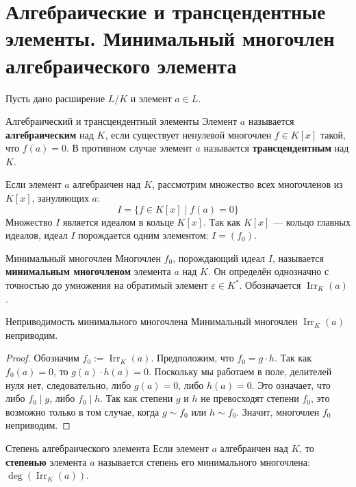 
\section{Алгебраические и трансцендентные элементы. Минимальный многочлен алгебраического элемента}

Пусть дано расширение $L/K$ и элемент $a \in L$.

\begin{Definition}{Алгебраический и трансцендентный элементы}{}
	Элемент $a$ называется \textbf{алгебраическим} над $K$, если существует ненулевой многочлен $f \in K[x]$ такой, что $f(a) = 0$.
	В противном случае элемент $a$ называется \textbf{трансцендентным} над $K$.
\end{Definition}

Если элемент $a$ алгебраичен над $K$, рассмотрим множество всех многочленов из $K[x]$, зануляющих $a$:
\[ I = \{ f \in K[x] \mid f(a) = 0 \} \]
Множество $I$ является идеалом в кольце $K[x]$. Так как $K[x]$ --- кольцо главных идеалов, идеал $I$ порождается одним элементом: $I = (f_0)$.

\begin{Definition}{Минимальный многочлен}{}
	Многочлен $f_0$, порождающий идеал $I$, называется \textbf{минимальным многочленом} элемента $a$ над $K$.
	Он определён однозначно с точностью до умножения на обратимый элемент $\varepsilon \in K^*$. Обозначается $\operatorname{Irr}_K(a)$.
\end{Definition}

\begin{Lemma}{Неприводимость минимального многочлена}{}
	Минимальный многочлен $\operatorname{Irr}_K(a)$ неприводим.
\end{Lemma}

\begin{proof}
	Обозначим $f_0 := \operatorname{Irr}_K(a)$. Предположим, что $f_0 = g \cdot h$.
	Так как $f_0(a) = 0$, то $g(a) \cdot h(a) = 0$. Поскольку мы работаем в поле, делителей нуля нет, следовательно, либо $g(a) = 0$, либо $h(a) = 0$.
	Это означает, что либо $f_0 \mid g$, либо $f_0 \mid h$.
	Так как степени $g$ и $h$ не превосходят степени $f_0$, это возможно только в том случае, когда $g \sim f_0$ или $h \sim f_0$.
	Значит, многочлен $f_0$ неприводим.
\end{proof}

\begin{Definition}{Степень алгебраического элемента}{}
	Если элемент $a$ алгебраичен над $K$, то \textbf{степенью} элемента $a$ называется степень его минимального многочлена: $\deg(\operatorname{Irr}_K(a))$.
\end{Definition}

